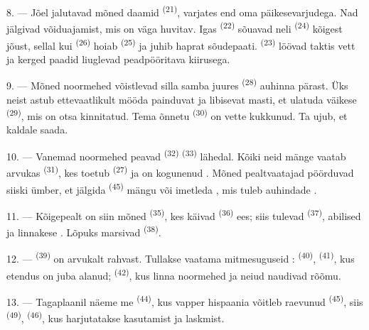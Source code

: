 \VUsaut{4.4mm}
\VUsaut{3.4mm}

8. --- Jõel jalutavad mõned daamid  \textsuperscript{(21)}, varjates end
oma päikesevarjudega. Nad jälgivad võiduajamist, mis on väga huvitav. Igas
 \textsuperscript{(22)} sõuavad neli 
\textsuperscript{(24)} kõigest jõust, sellal kui 
\textsuperscript{(26)} hoiab  \textsuperscript{(25)} ja juhib haprat
sõudepaati.  \textsuperscript{(23)} löövad taktis vett ja kerged paadid
liuglevad peadpööritava kiirusega.

9. --- Mõned noormehed võistlevad silla samba juures 
\textsuperscript{(28)} auhinna pärast. Üks neist astub ettevaatlikult mööda painduvat
ja libisevat masti, et ulatuda väikese  \textsuperscript{(29)}, mis on
otsa kinnitatud. Tema õnnetu  \textsuperscript{(30)} on vette
kukkunud. Ta ujub, et kaldale saada.

10. --- Vanemad noormehed peavad  \textsuperscript{(32)}
 \textsuperscript{(33)} lähedal. Kõiki neid mänge vaatab arvukas
 \textsuperscript{(31)}, kes toetub  \textsuperscript{(27)}
 ja on kogunenud . Mõned pealtvaatajad pöörduvad
siiski ümber, et jälgida  \textsuperscript{(45)} mängu või imetleda
, mis tuleb auhindade .

11. --- Kõigepealt on siin mõned  \textsuperscript{(35)}, kes käivad
 \textsuperscript{(36)} ees; siis tulevad 
\textsuperscript{(37)}, abilised ja linnakese . Lõpuks marsivad
 \textsuperscript{(38)}.

\VUsaut{5.0mm}
\VUsaut{3.6mm}

12. ---  \textsuperscript{(39)} on arvukalt rahvast. Tullakse
vaatama mitmesuguseid :  \textsuperscript{(40)},
 \textsuperscript{(41)}, kus etendus on juba alanud;  \textsuperscript{(42)}, kus linna noormehed ja neiud naudivad
 rõõmu.

13. --- Tagaplaanil näeme me  \textsuperscript{(44)}, kus vapper hispaania
 võitleb raevunud  \textsuperscript{(45)}, siis
 \textsuperscript{(49)}, 
\textsuperscript{(46)}, kus harjutatakse  kasutamist ja
 laskmist.

